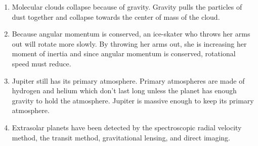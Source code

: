 \documentclass[../hw2.tex]{subfiles}
\begin{document}
    \begin{enumerate}
        \item {} Molecular clouds collapse because of gravity. Gravity pulls the particles of dust together and collapse towards the center of mass of the cloud.
        \item {} Because angular momentum is conserved, an ice-skater who throws her arms out will rotate more slowly. By throwing her arms out, she is increasing her moment of inertia and since angular momentum is conserved, rotational speed must reduce.
        \item {} Jupiter still has its primary atmosphere. Primary atmospheres are made of hydrogen and helium which don't last long unless the planet has enough gravity to hold the atmosphere. Jupiter is massive enough to keep its primary atmosphere.
        \item {} Extrasolar planets have been detected by the spectroscopic radial velocity method, the transit method, gravitational lensing, and direct imaging. %
    \end{enumerate}
    
\end{document}
